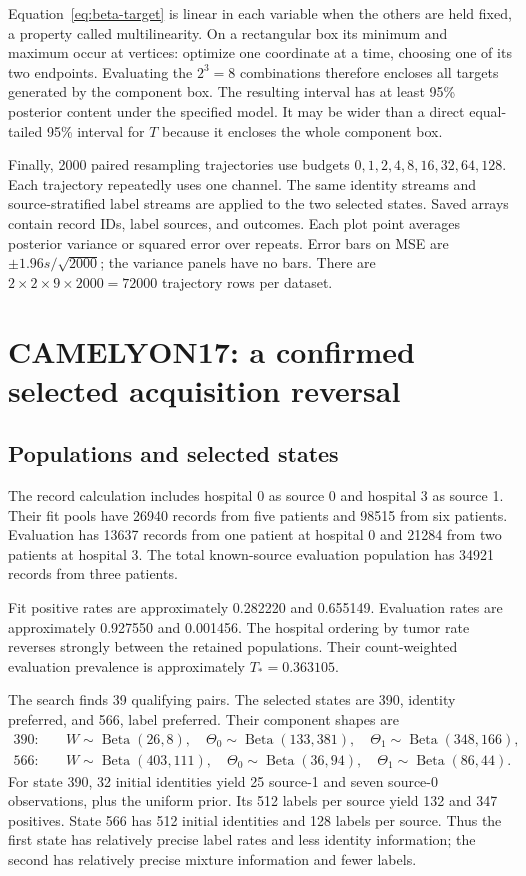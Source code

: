 \documentclass[11pt,a4paper]{report}
\newcommand{\Beta}{\operatorname{Beta}}
\begin{document}
Equation~\eqref{eq:beta-target} is linear in each variable when the others are held fixed, a property called multilinearity. On a rectangular box its minimum and maximum occur at vertices: optimize one coordinate at a time, choosing one of its two endpoints. Evaluating the $2^3=8$ combinations therefore encloses all targets generated by the component box. The resulting interval has at least 95\% posterior content under the specified model. It may be wider than a direct equal-tailed 95\% interval for $T$ because it encloses the whole component box.

Finally, 2000 paired resampling trajectories use budgets $0,1,2,4,8,16,32,64,128$. Each trajectory repeatedly uses one channel. The same identity streams and source-stratified label streams are applied to the two selected states. Saved arrays contain record IDs, label sources, and outcomes. Each plot point averages posterior variance or squared error over repeats. Error bars on MSE are $\pm1.96s/\sqrt{2000}$; the variance panels have no bars. There are $2\times2\times9\times2000=72000$ trajectory rows per dataset.

\chapter{CAMELYON17: a confirmed selected acquisition reversal}
\section{Populations and selected states}
The record calculation includes hospital 0 as source 0 and hospital 3 as source 1. Their fit pools have 26940 records from five patients and 98515 from six patients. Evaluation has 13637 records from one patient at hospital 0 and 21284 from two patients at hospital 3. The total known-source evaluation population has 34921 records from three patients.

Fit positive rates are approximately 0.282220 and 0.655149. Evaluation rates are approximately 0.927550 and 0.001456. The hospital ordering by tumor rate reverses strongly between the retained populations. Their count-weighted evaluation prevalence is approximately $T_*=0.363105$.

The search finds 39 qualifying pairs. The selected states are 390, identity preferred, and 566, label preferred. Their component shapes are
\begin{align*}
390:\quad&W\sim\Beta(26,8),\quad\Theta_0\sim\Beta(133,381),\quad\Theta_1\sim\Beta(348,166),\\
566:\quad&W\sim\Beta(403,111),\quad\Theta_0\sim\Beta(36,94),\quad\Theta_1\sim\Beta(86,44).
\end{align*}
For state 390, 32 initial identities yield 25 source-1 and seven source-0 observations, plus the uniform prior. Its 512 labels per source yield 132 and 347 positives. State 566 has 512 initial identities and 128 labels per source. Thus the first state has relatively precise label rates and less identity information; the second has relatively precise mixture information and fewer labels.
\end{document}
